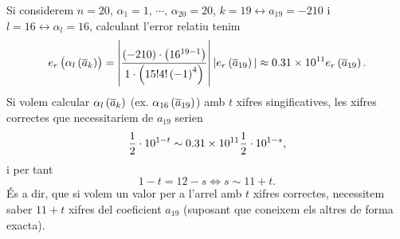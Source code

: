 \begin{example}
  Si considerem $n=20$, $\alpha_1 = 1,\,\cdots,\,\alpha_{20} = 20$, $k = 19 \leftrightarrow a_{19} = -210$ i $l = 16 \leftrightarrow \alpha_l = 16$, calculant l'error relatiu tenim
  \[
     e_r\left( \alpha_l\left( \overline{a}_k\right) \right)  = \left|\frac{\left( -210\right) \cdot\left( 16^{19-1}\right) }{1\cdot\left( 15!4!\left( -1\right) ^4\right) }\right| |e_r\left( \overline{a}_{19}\right) | \approx \SI{0.31e11}{}e_r\left( \overline{a}_{19}\right).
  \]
  Si volem calcular $\alpha_l\left( \overline{a}_k\right) $ (ex. $\alpha_{16}\left( \overline{a}_{19}\right) $) amb $t$ xifres singificatives, les xifres correctes que necessitariem de $a_{19}$ serien
  \[
    \frac{1}{2}\cdot10^{1-t} \sim \SI{0.31e11}{}\frac{1}{2}\cdot10^{1-s},
  \]
  i per tant
  \[
    1 - t = 12 - s \iff s \sim 11 + t.
  \]
  És a dir, que si volem un valor per a l'arrel amb $t$ xifres correctes, necessitem saber $11+t$ xifres del coeficient $a_{19}$ (suposant que coneixem els altres de forma exacta).
\end{example}
